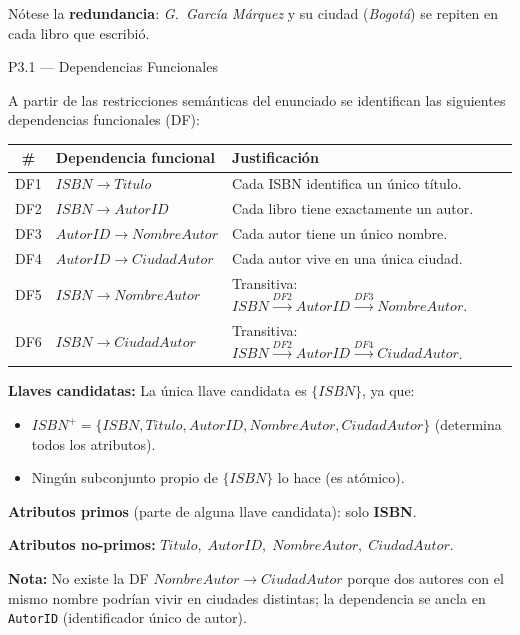 \documentclass[12pt,a4paper]{article}
\begin{document}
\vspace{0.3cm}
Nótese la \textbf{redundancia}: \textit{G.\ García Márquez} y su ciudad
(\textit{Bogotá}) se repiten en cada libro que escribió.

\vspace{0.6cm}

\begin{querybox}{P3.1 --- Dependencias Funcionales}

A partir de las restricciones semánticas del enunciado se identifican las
siguientes dependencias funcionales (DF):

\vspace{0.3cm}
\begin{center}
\begin{tabular}{clp{7.5cm}}
  \toprule
  \textbf{\#} & \textbf{Dependencia funcional} & \textbf{Justificación} \\
  \midrule
  DF1 & $ISBN \to Titulo$         & Cada ISBN identifica un único título. \\
  DF2 & $ISBN \to AutorID$        & Cada libro tiene exactamente un autor. \\
  DF3 & $AutorID \to NombreAutor$ & Cada autor tiene un único nombre. \\
  DF4 & $AutorID \to CiudadAutor$ & Cada autor vive en una única ciudad. \\
  DF5 & $ISBN \to NombreAutor$    & Transitiva: $ISBN \xrightarrow{DF2} AutorID \xrightarrow{DF3} NombreAutor$. \\
  DF6 & $ISBN \to CiudadAutor$    & Transitiva: $ISBN \xrightarrow{DF2} AutorID \xrightarrow{DF4} CiudadAutor$. \\
  \bottomrule
\end{tabular}
\end{center}

\vspace{0.4cm}
\textbf{Llaves candidatas:} La única llave candidata es $\{ISBN\}$, ya que:
\begin{itemize}[leftmargin=1.5em,itemsep=2pt]
  \item $ISBN^+ = \{ISBN, Titulo, AutorID, NombreAutor, CiudadAutor\}$
        (determina todos los atributos).
  \item Ningún subconjunto propio de $\{ISBN\}$ lo hace (es atómico).
\end{itemize}

\vspace{0.2cm}
\textbf{Atributos primos} (parte de alguna llave candidata): solo \textbf{ISBN}.

\textbf{Atributos no-primos:} $Titulo,\; AutorID,\; NombreAutor,\; CiudadAutor$.

\vspace{0.2cm}
\footnotesize\textbf{Nota:} No existe la DF $NombreAutor \to CiudadAutor$
porque dos autores con el mismo nombre podrían vivir en ciudades distintas;
la dependencia se ancla en \texttt{AutorID} (identificador único de autor).

\end{querybox}
\end{document}
